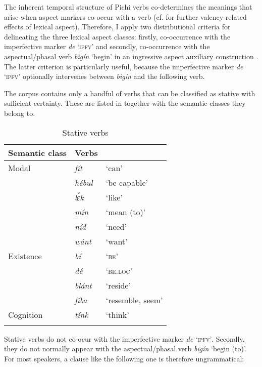 The inherent temporal structure of Pichi verbs co-determines the meanings that arise when aspect markers co-occur with a verb (cf.  for further valency-related effects of lexical aspect). Therefore, I apply two distributional criteria for delineating the three lexical aspect classes: firstly, co-occurrence with the imperfective marker \textit{de} ‘\textsc{ipfv’} and secondly, co-occurrence with the aspectual/phasal verb \textit{bigín} ‘begin’ in an ingressive aspect auxiliary construction \citep[8]{Sasse1991}. The latter criterion is particularly useful, because the imperfective marker \textit{de} ‘\textsc{ipfv’} optionally intervenes between \textit{bigín} and the following verb.



The corpus contains only a handful of verbs that can be classified as stative with sufficient certainty. These are listed in  together with the semantic classes they belong to.


\begin{table}
\caption{Stative verbs}
\label{tab:key:6.1}

\begin{tabularx}{.8\textwidth}{XXX}
\lsptoprule
Semantic class & Verbs & \\
\midrule
Modal & \itshape fít & ‘can’\\
& \itshape hébul & ‘be capable’\\
& \itshape lɛ́k & ‘like’\\
& \itshape mín & ‘mean (to)’\\
& \itshape níd & ‘need’\\
& \itshape wánt & ‘want’\\

\tablevspace
Existence & \itshape bí & \textsc{‘be’}\\
& \itshape dé & \textsc{‘be.loc’}\\
& \itshape blánt & ‘reside’\\
& \itshape fíba & ‘resemble, seem’\\

\tablevspace
Cognition & \itshape tínk & ‘think’\\
\lspbottomrule
\end{tabularx}
\end{table}
Stative verbs do not co-ocur with the imperfective marker \textit{de} ‘\textsc{ipfv’}. Secondly, they do not normally appear with the aspectual/phasal verb \textit{bigín} ‘begin (to)’. For most speakers, a clause like the following one is therefore ungrammatical: 


